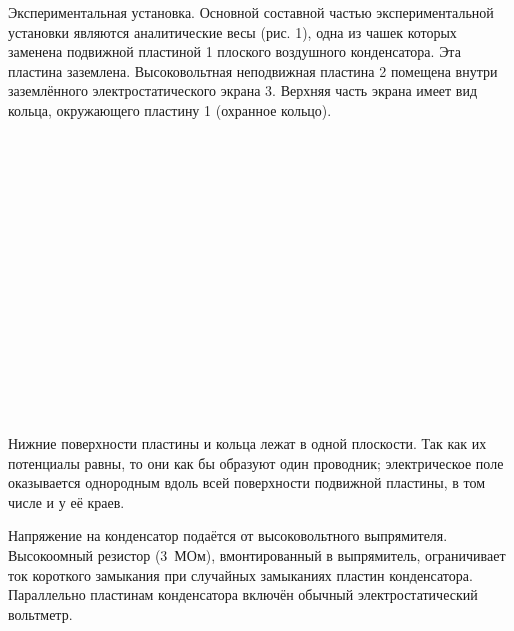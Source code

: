 Экспериментальная установка. Основной составной частью экспериментальной установки являются аналитические весы (рис. 1), одна из
чашек которых заменена подвижной пластиной 1 плоского воздушного
конденсатора. Эта пластина заземлена. Высоковольтная неподвижная
пластина 2 помещена внутри заземлённого электростатического экрана 3. Верхняя часть экрана имеет вид кольца, окружающего пластину 1
(охранное кольцо).
\\
\\
\\
\\
\\
\\
\\
\\
\\
\\
\\
\\
\\
\\
\\
\\
\\
Нижние поверхности пластины и кольца лежат в одной плоскости.
Так как их потенциалы равны, то они как бы образуют один проводник;
электрическое поле оказывается однородным вдоль всей поверхности
подвижной пластины, в том числе и у её краев.

    Напряжение на конденсатор подаётся от высоковольтного выпрямителя. Высокоомный резистор (3~МОм), вмонтированный в выпрямитель, ограничивает ток короткого замыкания при случайных замыканиях пластин конденсатора. Параллельно пластинам конденсатора
включён обычный электростатический вольтметр.

